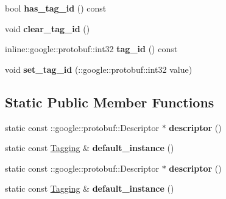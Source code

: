 \begin{DoxyCompactItemize}
\item 
\hypertarget{classTagging_a8ef6eb12fffbe4fbd1b1fc622fc4fb87}{
bool {\bfseries has\_\-tag\_\-id} () const }
\label{classTagging_a8ef6eb12fffbe4fbd1b1fc622fc4fb87}

\item 
\hypertarget{classTagging_a25056abd232cdf45b153cb4b02b82dc2}{
void {\bfseries clear\_\-tag\_\-id} ()}
\label{classTagging_a25056abd232cdf45b153cb4b02b82dc2}

\item 
\hypertarget{classTagging_a2101441b351719ab45adde574a0e7255}{
inline::google::protobuf::int32 {\bfseries tag\_\-id} () const }
\label{classTagging_a2101441b351719ab45adde574a0e7255}

\item 
\hypertarget{classTagging_a44fc9490ab405218c27f13fa056b2ff5}{
void {\bfseries set\_\-tag\_\-id} (::google::protobuf::int32 value)}
\label{classTagging_a44fc9490ab405218c27f13fa056b2ff5}

\end{DoxyCompactItemize}
\subsection*{Static Public Member Functions}
\begin{DoxyCompactItemize}
\item 
\hypertarget{classTagging_a15430f96418c7b50335efcfe444c841f}{
static const ::google::protobuf::Descriptor $\ast$ {\bfseries descriptor} ()}
\label{classTagging_a15430f96418c7b50335efcfe444c841f}

\item 
\hypertarget{classTagging_a14f13d5d1d6489912bfc06ca67b484f7}{
static const \hyperlink{classTagging}{Tagging} \& {\bfseries default\_\-instance} ()}
\label{classTagging_a14f13d5d1d6489912bfc06ca67b484f7}

\item 
\hypertarget{classTagging_a15430f96418c7b50335efcfe444c841f}{
static const ::google::protobuf::Descriptor $\ast$ {\bfseries descriptor} ()}
\label{classTagging_a15430f96418c7b50335efcfe444c841f}

\item 
\hypertarget{classTagging_a14f13d5d1d6489912bfc06ca67b484f7}{
static const \hyperlink{classTagging}{Tagging} \& {\bfseries default\_\-instance} ()}
\label{classTagging_a14f13d5d1d6489912bfc06ca67b484f7}

\end{DoxyCompactItemize}
